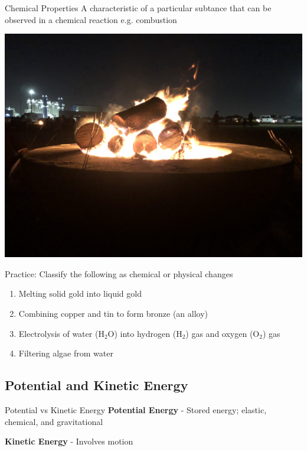 \documentclass[11pt]{beamer}
\begin{document}
\begin{frame}{Chemical Properties}
  A characteristic of a particular subtance that can be observed
  in a chemical reaction e.g. combustion

  \centering
  \includegraphics[scale=0.05]{bonfire}
\end{frame}

\begin{frame}{Practice: Classify the following as chemical or physical changes}
  \begin{enumerate}
  \item Melting solid gold into liquid gold
  \item Combining copper and tin to form bronze (an alloy)
  \item Electrolysis of water (H$_2$O) into hydrogen (H$_2$) gas and oxygen (O$_2$)
    gas
  \item Filtering algae from water
  \end{enumerate}
\end{frame}

\subsection{Potential and Kinetic Energy}

\begin{frame}{Potential vs Kinetic Energy}
  \textbf{Potential Energy} - Stored energy; elastic, chemical, and
  gravitational

  \textbf{Kinetic Energy} - Involves motion

  \vfill
\end{frame}
\end{document}
